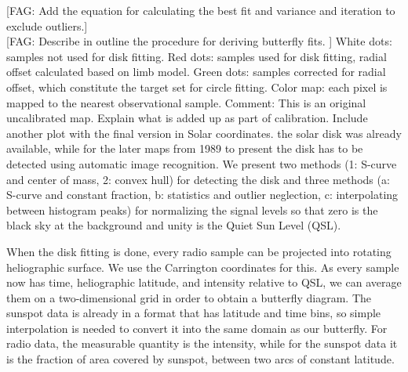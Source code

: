\documentclass{aa}
\newcommand{\fag}[1]{\textcolor{midpurple}{[FAG: #1]}} %
\begin{document}
  \fag{Add the equation for calculating the best fit and variance and iteration to exclude outliers.}\\
  \fag{Describe in outline the procedure for deriving butterfly fits.
  }
    White dots: samples not used for disk fitting. Red 
  dots: samples used for disk fitting, radial offset calculated based on limb model. Green dots: samples corrected for 
  radial offset, which constitute the target set for circle fitting. Color map: each pixel is mapped to the nearest 
  observational sample. Comment: This is an original uncalibrated map. Explain what is added up as part of calibration. Include another plot with the final version in Solar coordinates.
  the solar disk was already available, while for the later maps from 
  1989 to present the disk 
  has to be detected using automatic image recognition. 
  We present two methods (1: S-curve and 
  center of mass, 2: convex hull) for detecting the disk and three methods (a: S-curve and constant fraction, b: 
  statistics and outlier neglection, c: interpolating between histogram peaks) for normalizing the signal levels so that 
  zero is the black sky at the background and unity is the Quiet Sun Level (QSL).

When the disk fitting is done, every radio sample can be projected into rotating heliographic surface. We use the 
Carrington coordinates for this. As every sample now has time, heliographic latitude, and intensity relative to QSL, we 
can average them on a two-dimensional grid in order to obtain a butterfly diagram. The sunspot data is already in a 
format that has latitude and time bins, so simple interpolation is needed to convert it into the same domain as our 
butterfly. For radio data, the measurable quantity is the intensity, while for the sunspot data it is the fraction of 
area covered by sunspot, between two arcs of constant latitude.
\end{document}
